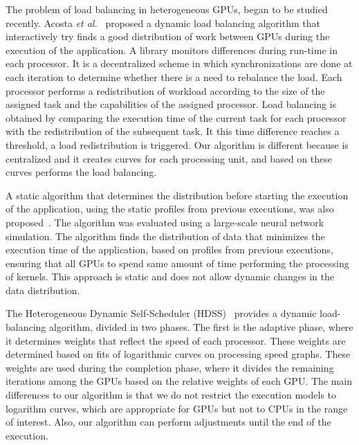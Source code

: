 \documentclass[journal]{IEEEtran}
\begin{document}
The problem of load balancing in heterogeneous GPUs, began to be studied
recently. Acosta \emph{et al.}~\cite{acosta} proposed a dynamic load balancing
algorithm that interactively try finds a good distribution of work between GPUs
during the execution of the application. A library monitors differences during run-time in each processor. It is a decentralized scheme in which synchronizations are done at each iteration to determine whether there is a need to rebalance the load. Each processor performs a redistribution of workload according to the size of the assigned task and the capabilities of
the assigned processor. Load balancing is obtained by comparing the execution
time of the current task for each processor with the redistribution of the
subsequent task. It this time difference reaches a threshold, a load redistribution is
triggered. Our algorithm is different because is centralized and it creates curves for each
 processing unit, and based on these curves performs the load balancing.

A static algorithm that determines the distribution before starting the
execution of the application, using the static profiles from previous
executions, was also proposed~\cite{raphael}. The algorithm was evaluated using
a large-scale neural network simulation. The algorithm finds the distribution of
data that minimizes the execution time of the application, based on profiles
from previous executions, ensuring that all GPUs to spend same amount of time
performing the processing of kernels. This approach is static and does not allow dynamic
changes in the data distribution.

The Heterogeneous Dynamic Self-Scheduler (HDSS)~\cite{HDSS} provides a dynamic
load-balancing algorithm, divided in two phases. The first is the adaptive
phase, where it determines weights that reflect the speed of each processor.
These weights are determined based on fits of logarithmic curves on processing
speed graphs. These weights are used during the completion phase, where it
divides the remaining iterations among the GPUs based on the relative weights of
each GPU. The main differences to our algorithm is that we do not restrict the
execution models to logarithm curves, which are appropriate for GPUs but not to
CPUs in the range of interest. Also, our algorithm can perform adjustments until
the end of the execution.



\end{document}
